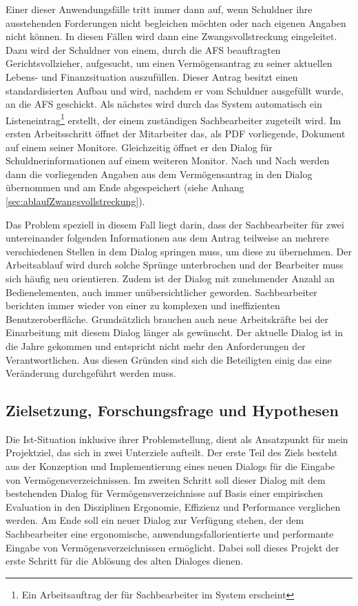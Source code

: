 Einer dieser Anwendungsfälle tritt immer dann auf, wenn Schuldner ihre ausstehenden Forderungen nicht begleichen möchten oder nach eigenen Angaben nicht können. In diesen Fällen wird dann eine Zwangsvollstreckung eingeleitet. Dazu wird der Schuldner von einem, durch die \gls{AFS} beauftragten Gerichtsvollzieher, aufgesucht, um einen Vermögensantrag zu seiner aktuellen Lebens- und Finanzsituation auszufüllen. Dieser Antrag besitzt einen standardisierten Aufbau und wird, nachdem er vom Schuldner ausgefüllt wurde, an die \gls{AFS} geschickt. Als nächstes wird durch das System automatisch ein Listeneintrag\footnote{Ein Arbeitsauftrag der für Sachbearbeiter im System erscheint} erstellt, der einem zuständigen Sachbearbeiter zugeteilt wird. Im ersten Arbeitsschritt öffnet der Mitarbeiter das, als PDF vorliegende, Dokument auf einem seiner Monitore. Gleichzeitig öffnet er den Dialog für Schuldnerinformationen auf einem weiteren Monitor. Nach und Nach werden dann die vorliegenden Angaben aus dem Vermögensantrag in den Dialog übernommen und am Ende abgespeichert (siehe
Anhang \ref{sec:ablaufZwangsvollstreckung}).

Das Problem speziell in diesem Fall liegt darin, dass der Sachbearbeiter für zwei untereinander folgenden Informationen aus dem Antrag teilweise an mehrere verschiedenen Stellen in dem Dialog springen muss, um diese zu übernehmen. Der Arbeitsablauf wird durch solche Sprünge unterbrochen und der Bearbeiter muss sich häufig neu orientieren. Zudem ist der Dialog mit zunehmender Anzahl an Bedienelementen, auch immer unübersichtlicher geworden. Sachbearbeiter berichten immer wieder von einer zu komplexen und ineffizienten Benutzeroberfläche. Grundsätzlich brauchen auch neue Arbeitskräfte bei der Einarbeitung mit diesem Dialog länger als gewünscht. Der aktuelle Dialog ist in die Jahre gekommen und entspricht nicht mehr den Anforderungen der Verantwortlichen. Aus diesen Gründen sind sich die Beteiligten einig das eine Veränderung durchgeführt werden muss.


\subsection{Zielsetzung, Forschungsfrage und Hypothesen}
Die Ist-Situation inklusive ihrer Problemstellung, dient als Ansatzpunkt für mein Projektziel, das sich in zwei Unterziele aufteilt. Der erste Teil des Ziels besteht aus der Konzeption und Implementierung eines neuen Dialogs für die Eingabe von Vermögensverzeichnissen. Im zweiten Schritt soll dieser Dialog mit dem bestehenden Dialog für Vermögensverzeichnisse auf Basis einer empirischen Evaluation in den Disziplinen Ergonomie, Effizienz und Performance verglichen werden. Am Ende soll ein neuer Dialog zur Verfügung stehen, der dem Sachbearbeiter eine ergonomische, anwendungsfallorientierte und performante Eingabe von Vermögensverzeichnissen ermöglicht. Dabei soll dieses Projekt der erste Schritt für die Ablösung des alten Dialoges dienen. 

